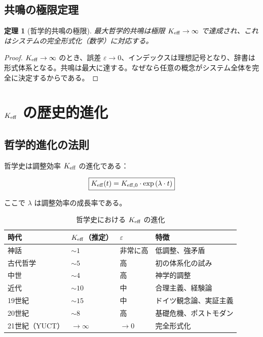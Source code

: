 \documentclass[11pt,a4paper]{article}
\newtheorem{theorem}{定理}[section]
\newcommand{\eps}{\varepsilon}
\begin{document}
	\subsection{共鳴の極限定理}
	
	\begin{theorem}[哲学的共鳴の極限]
		最大哲学的共鳴は極限 \(\Keff \to \infty\) で達成され、これはシステムの完全形式化（数学）に対応する。
	\end{theorem}
	
	\begin{proof}
		\(\Keff \to \infty\) のとき、誤差 \(\eps \to 0\)、インデックスは理想記号となり、辞書は形式体系となる。共鳴は最大に達する。なぜなら任意の概念がシステム全体を完全に決定するからである。
	\end{proof}
	
	\section{\texorpdfstring{\(\Keff\)}{K\_eff} の歴史的進化}
	
	\subsection{哲学的進化の法則}
	
	哲学史は調整効率 \(\Keff\) の進化である：
	
	\begin{equation}
		\boxed{
			\Keff(t) = \Keff[0] \cdot \exp\left(\lambda \cdot t\right)
		}
	\end{equation}
	
	ここで \(\lambda\) は調整効率の成長率である。
	
	\begin{table}[H]
		\centering
		\caption{哲学史における \(\Keff\) の進化}
		\begin{tabular}{p{3cm}p{3cm}p{3cm}p{4cm}}
			\toprule
			\textbf{時代} & \(\Keff\)（推定） & \(\eps\) & \textbf{特徴} \\
			\midrule
			神話 & \(\sim 1\) & 非常に高 & 低調整、強矛盾 \\
			古代哲学 & \(\sim 5\) & 高 & 初の体系化の試み \\
			中世 & \(\sim 4\) & 高 & 神学的調整 \\
			近代 & \(\sim 10\) & 中 & 合理主義、経験論 \\
			19世紀 & \(\sim 15\) & 中 & ドイツ観念論、実証主義 \\
			20世紀 & \(\sim 8\) & 高 & 基礎危機、ポストモダン \\
			21世紀（YUCT） & \(\to \infty\) & \(\to 0\) & 完全形式化 \\
			\bottomrule
		\end{tabular}
	\end{table}
	
\end{document}
